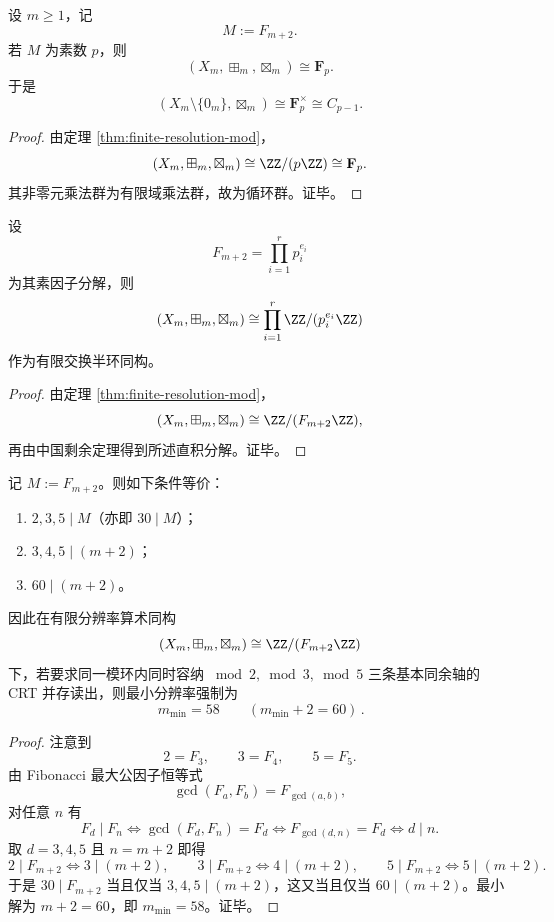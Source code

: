 \begin{corollary}\label{cor:field-phase-fib-prime}
设 \(m\ge 1\)，记
\[
M:=F_{m+2}.
\]
若 \(M\) 为素数 \(p\)，则
\[
(X_m,\boxplus_m,\boxtimes_m)\cong \mathbf F_p.
\]
于是
\[
(X_m\setminus\{0_m\},\boxtimes_m)\cong \mathbf F_p^\times\cong C_{p-1}.
\]
\end{corollary}
\begin{proof}
由定理 \ref{thm:finite-resolution-mod}，
\[
(X_m,\boxplus_m,\boxtimes_m)\cong \ZZ/(p\ZZ)\cong \mathbf F_p.
\]
其非零元乘法群为有限域乘法群，故为循环群。证毕。
\end{proof}

\begin{corollary}[CRT 分裂]\label{cor:crt-factorization}
设
\[
F_{m+2}=\prod_{i=1}^{r} p_i^{e_i}
\]
为其素因子分解，则
\[
(X_m,\boxplus_m,\boxtimes_m)
\cong
\prod_{i=1}^{r}\ZZ/(p_i^{e_i}\ZZ)
\]
作为有限交换半环同构。
\end{corollary}
\begin{proof}
由定理 \ref{thm:finite-resolution-mod}，
\[
(X_m,\boxplus_m,\boxtimes_m)\cong \ZZ/(F_{m+2}\ZZ),
\]
再由中国剩余定理得到所述直积分解。证毕。
\end{proof}

\begin{proposition}[2/3/5 三轴并存的最小模深度]\label{prop:crt-235-min-depth}
记 \(M:=F_{m+2}\)。则如下条件等价：
\begin{enumerate}
  \item \(2,3,5\mid M\)（亦即 \(30\mid M\)）；
  \item \(3,4,5\mid (m+2)\)；
  \item \(60\mid (m+2)\)。
\end{enumerate}
因此在有限分辨率算术同构
\[
(X_m,\boxplus_m,\boxtimes_m)\cong \ZZ/(F_{m+2}\ZZ)
\]
下，若要求同一模环内同时容纳 \(\bmod 2,\bmod 3,\bmod 5\) 三条基本同余轴的 CRT 并存读出，则最小分辨率强制为
\[
\boxed{\,m_{\min}=58\qquad(m_{\min}+2=60)\, }.
\]
\end{proposition}
\begin{proof}
注意到
\[
2=F_3,\qquad 3=F_4,\qquad 5=F_5.
\]
由 Fibonacci 最大公因子恒等式
\[
\gcd(F_a,F_b)=F_{\gcd(a,b)},
\]
对任意 \(n\) 有
\[
F_d\mid F_n
\Longleftrightarrow
\gcd(F_d,F_n)=F_d
\Longleftrightarrow
F_{\gcd(d,n)}=F_d
\Longleftrightarrow
d\mid n.
\]
取 \(d=3,4,5\) 且 \(n=m+2\) 即得
\[
2\mid F_{m+2}\Longleftrightarrow 3\mid(m+2),\qquad
3\mid F_{m+2}\Longleftrightarrow 4\mid(m+2),\qquad
5\mid F_{m+2}\Longleftrightarrow 5\mid(m+2).
\]
于是 \(30\mid F_{m+2}\) 当且仅当 \(3,4,5\mid(m+2)\)，这又当且仅当 \(60\mid(m+2)\)。最小解为 \(m+2=60\)，即 \(m_{\min}=58\)。证毕。
\end{proof}


